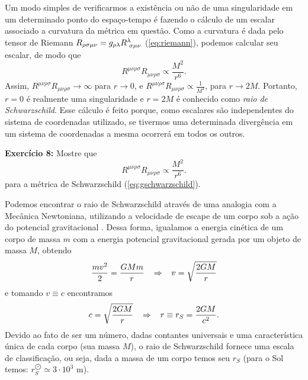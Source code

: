 \documentclass[12pt,a4paper,titlepage,brazil]{article}
\begin{document}
Um modo simples de verificarmos a existência ou não de uma singularidade em um determinado ponto do espaço-tempo é fazendo o cálculo de um escalar associado a curvatura da métrica em questão. Como a curvatura é dada pelo tensor de Riemann $R_{\rho \sigma \mu \nu} = g_{\rho \lambda} R^{\lambda}_{\hspace{0.1cm}\sigma \mu \nu}$ (\ref{eq:riemann}), podemos calcular seu escalar, de modo que
\begin{equation}
 R^{\mu \nu \rho \sigma}R_{\mu \nu \rho \sigma} \propto \frac{M^2}{r^6} . \label{eq:escalarriemann}
\end{equation}
Assim, $R^{\mu \nu \rho \sigma}R_{\mu \nu \rho \sigma} \rightarrow \infty$ para $r \rightarrow 0$, e $R^{\mu \nu \rho \sigma}R_{\mu \nu \rho \sigma} \propto \frac{1}{M^4}$, para $r \rightarrow 2 M$. Portanto, $r = 0$ é realmente uma singularidade e $r = 2 M$ é conhecido como \emph{raio de Schwarzschild}. Esse cálculo é feito porque, como escalares são independentes do sistema de coordenadas utilizado, se tivermos uma determinada divergência em um sistema de coordenadas a mesma ocorrerá em todos os outros. 

\begin{tcolorbox}
  {\bf Exercício 8:} Mostre que
\begin{equation}
 R^{\mu \nu \rho \sigma}R_{\mu \nu \rho \sigma} \propto \frac{M^2}{r^6} .
\end{equation}
para a métrica de Schwarzschild (\ref{eq:gschwarzschild}).
\end{tcolorbox}

Podemos encontrar o raio de Schwarzschild através de uma analogia com a Mecânica Newtoniana, utilizando a velocidade de escape de um corpo sob a ação do potencial gravitacional \cite{carroll2004, saa2016}. Dessa forma, igualamos a energia cinética de um corpo de massa $m$ com a energia potencial gravitacional gerada por um objeto de massa $M$, obtendo
\begin{equation}
 \frac{m v^2}{2} = \frac{G M m}{r} \hspace{0.3cm} \Rightarrow \hspace{0.3cm}
 v = \sqrt{\frac{2 G M}{r}} \nonumber
\end{equation}
e tomando $v \equiv c$ encontramos
\begin{equation}
 c = \sqrt{\frac{2 G M}{r}} \hspace{0.3cm} \Rightarrow \hspace{0.3cm} r \equiv r_S = \frac{2 G M}{c^2} \nonumber. \label{eq:rs}
\end{equation}
Devido ao fato de ser um número, dadas contantes universais e uma característica única de cada corpo (sua massa $M$), o raio de Schwarzschild fornece uma escala de classificação, ou seja, dada a massa de um corpo temos seu $r_S$ (para o Sol temos: $r^{\bigodot}_{S} \simeq 3 \cdot 10^3$ m). 
\end{document}
